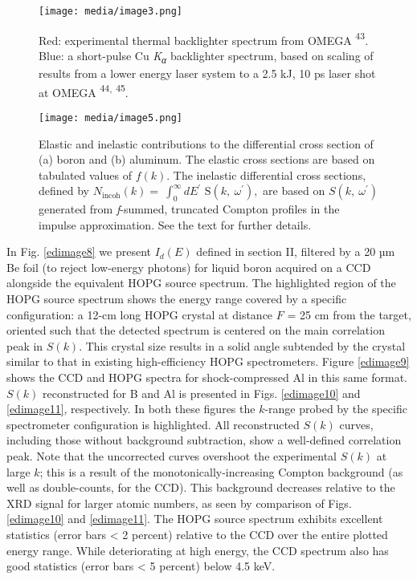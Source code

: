 \begin{figure}[h] 
\caption{ Red: experimental thermal
backlighter spectrum from OMEGA
{\textsuperscript{43}}\emph{.}
Blue: a short-pulse Cu \emph{K\textsubscript{α}} backlighter spectrum,
based on scaling of results from a lower energy laser system to a 2.5
kJ, 10 ps laser shot at OMEGA
{\textsuperscript{44}}\textsuperscript{,}
{\textsuperscript{45}}{}.}
\label{edimage3}
\centering
\texttt{[image: media/image3.png]}
\end{figure}

\begin{figure}[!ht] 
\caption{ Elastic and inelastic contributions to the differential cross
section of (a) boron and (b) aluminum. The elastic cross sections are
based on tabulated values of \(f(k)\). The inelastic differential cross
sections, defined by
\(N_{\text{incoh}}\left( k \right) = \ \int_{0}^{\infty}{dE^{'}}\text{\ S}\left( k,\ \omega^{'} \right),\)
are based on \(S\left( k,\ \omega^{'} \right)\) generated from
\emph{f}-summed, truncated Compton profiles in the impulse
approximation. See the text for further details.}
\label{edimage5}
\centering
\texttt{[image: media/image5.png]}
\end{figure}

\FloatBarrier


In Fig. \ref{edimage8} we present \(I_{d}\left( E \right)\) defined in section II,
filtered by a 20 µm Be foil (to reject low-energy photons) for liquid
boron acquired on a CCD alongside the equivalent HOPG source spectrum.
The highlighted region of the HOPG source spectrum shows the energy
range covered by a specific configuration: a 12-cm long HOPG crystal at
distance \(F\) = 25 cm from the target, oriented such that the detected
spectrum is centered on the main correlation peak in \(S(k)\). This
crystal size results in a solid angle subtended by the crystal similar
to that in existing high-efficiency HOPG spectrometers. \cite{pak2004x}
Figure \ref{edimage9} shows the CCD and HOPG spectra for shock-compressed Al in this
same format. \(S\left( k \right)\) reconstructed for B and Al is
presented in Figs. \ref{edimage10} and \ref{edimage11}, respectively. In both these figures the
\(k\)-range probed by the specific spectrometer configuration is
highlighted. All reconstructed \(S\left( k \right)\) curves, including
those without background subtraction, show a well-defined correlation
peak. Note that the uncorrected curves overshoot the experimental
\(S\left( k \right)\) at large \(k\); this is a result of the
monotonically-increasing Compton background (as well as double-counts,
for the CCD). This background decreases relative to the XRD signal for
larger atomic numbers, as seen by comparison of Figs. \ref{edimage10} and \ref{edimage11}. The
HOPG source spectrum exhibits excellent statistics (error bars
\textless{} 2 percent) relative to the CCD over the entire plotted
energy range. While deteriorating at high energy, the CCD spectrum also
has good statistics (error bars \textless{} 5 percent) below 4.5 keV.

